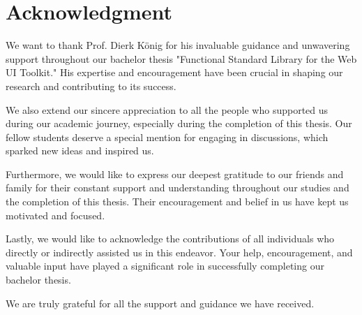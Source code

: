 \chapter{Acknowledgment}
We want to thank Prof. Dierk König for his invaluable guidance and unwavering
support throughout our bachelor thesis "Functional Standard Library for
the Web UI Toolkit." His expertise and encouragement have been crucial in
shaping our research and contributing to its success.

We also extend our sincere appreciation to all the people who supported us
during our academic journey, especially during the completion of this thesis.
Our fellow students deserve a special mention for engaging in discussions,
which sparked new ideas and inspired us.

Furthermore, we would like to express our deepest gratitude to our friends and
family for their constant support and understanding throughout our studies and
the completion of this thesis. Their encouragement and belief in us have kept
us motivated and focused.

Lastly, we would like to acknowledge the contributions of all individuals who
directly or indirectly assisted us in this endeavor. Your help, encouragement,
and valuable input have played a significant role in successfully completing
our bachelor thesis.

We are truly grateful for all the support and guidance we have received.
